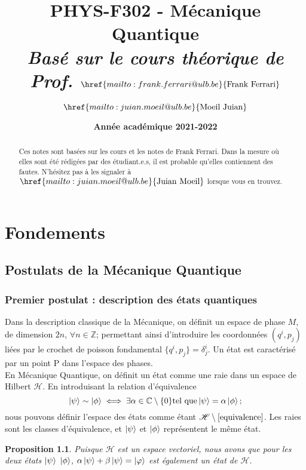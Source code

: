 \documentclass{report}
\title{\textbf{PHYS-F302 - Mécanique Quantique} \\ \textit{Basé sur le cours théorique de Prof. $\href{mailto:frank.ferrari@ulb.be}{\text{Frank Ferrari}}$}}
\author{$\href{mailto:juian.moeil@ulb.be}{\text{Moeil Juian}}$}
\date{\textbf{Année académique 2021-2022}}
\numberwithin{equation}{part}
\newtheorem{Property}[theorem]{Proposition}
\begin{document}
\maketitle

\begin{abstract}
    Ces notes sont basées sur les cours et les notes de Frank Ferrari. Dans la mesure où elles sont été rédigées par des étudiant.e.s, il est probable qu'elles contiennent des fautes. N'hésitez pas à les signaler à $\href{mailto:juian.moeil@ulb.be}{\text{Juian Moeil}}$ lorsque vous en trouvez.
\end{abstract}
\newpage

\part{Fondements}

\chapter{Postulats de la Mécanique Quantique}

\section{Premier postulat : description des états quantiques}

Dans la description classique de la Mécanique, on définit un espace de phase $M$, de dimension $2n$, $\forall n\in\mathbb{Z}$; permettant ainsi d'introduire les coordonnées $\left(q^i,p_j\right)$ liées par le crochet de poisson fondamental $\{q^i,p_j\}=\delta^i_j$. Un état est caractérisé par un point P dans l'espace des phases.\\

En Mécanique Quantique, on définit un état comme une raie dans un espace de Hilbert $\mathcal{H}$. En introduisant la relation d'équivalence
\begin{equation}
\label{equivalence}
    \ket{\psi} \sim \ket{\phi} \iff \exists \alpha\in\mathbb{C}\setminus\{0\} \text{tel que} \ket{\psi}=\alpha\ket{\phi} ;
\end{equation}
nous pouvons définir l'espace des états comme étant $\mathcal{H}\setminus\ref{equivalence}$. Les raies sont les classes d'équivalence, et $\ket{\psi}$ et $\ket{\phi}$ représentent le même état.\\

\begin{Property}
    Puisque $\mathcal{H}$ est un espace vectoriel, nous avons que pour les deux états $\ket{\psi}$ $\ket{\phi}$, $\alpha\ket{\psi}+\beta\ket{\psi}=\ket{\varphi}$ est également un état de $\mathcal{H}$.
\end{Property}
\end{document}
